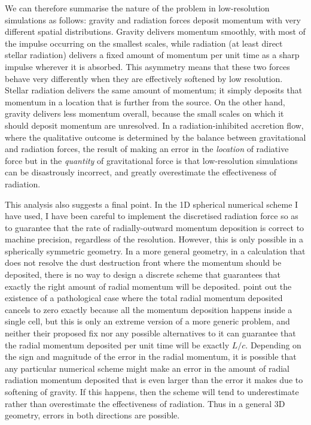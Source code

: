 \documentclass[useAMS,usenatbib]{mn2e}
\begin{document}
We can therefore summarise the nature of the problem in low-resolution simulations as follows: gravity and radiation forces deposit momentum with very different spatial distributions. Gravity delivers momentum smoothly, with most of the impulse occurring on the smallest scales, while radiation (at least direct stellar radiation) delivers a fixed amount of momentum per unit time as a sharp impulse wherever it is absorbed. This asymmetry means that these two forces behave very differently when they are effectively softened by low resolution. Stellar radiation delivers the same amount of momentum; it simply deposits that momentum in a location that is further from the source. On the other hand, gravity delivers less momentum overall, because the small scales on which it should deposit momentum are unresolved. In a radiation-inhibited accretion flow, where the qualitative outcome is determined by the balance between gravitational and radiation forces, the result of making an error in the \textit{location} of radiative force but in the \textit{quantity} of gravitational force is that low-resolution simulations can be disastrously incorrect, and greatly overestimate the effectiveness of radiation.

This analysis also suggests a final point. In the 1D spherical numerical scheme I have used, I have been careful to implement the discretised radiation force so as to guarantee that the rate of radially-outward momentum deposition is correct to machine precision, regardless of the resolution. However, this is only possible in a spherically symmetric geometry. In a more general geometry, in a calculation that does not resolve the dust destruction front where the momentum should be deposited, there is no way to design a discrete scheme that guarantees that exactly the right amount of radial momentum will be deposited.  \citet{hopkins18a} point out the existence of a pathological case where the total radial momentum deposited cancels to zero exactly because all the momentum deposition happens inside a single cell, but this is only an extreme version of a more generic problem, and neither their proposed fix nor any possible alternatives to it can guarantee that the radial momentum deposited per unit time will be exactly $L/c$. Depending on the sign and magnitude of the error in the radial momentum, it is possible that any particular numerical scheme might make an error in the amount of radial radiation momentum deposited that is even larger than the error it makes due to softening of gravity. If this happens, then the scheme will tend to underestimate rather than overestimate the effectiveness of radiation. Thus in a general 3D geometry, errors in both directions are possible.
\end{document}
